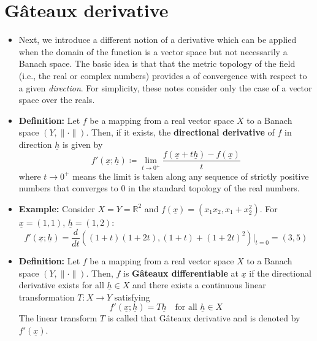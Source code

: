 \documentclass[11pt,twoside]{report}
\newcommand{\bbR}{{\mathbb{R}}}
\newcommand{\vecnot}{\underline}
\begin{document}
\section{G\^{a}teaux derivative}
\begin{itemize}


\item   Next, we introduce a different notion of a derivative which  can be applied when the domain of the function is a vector space but not necessarily a Banach space. The basic idea is that that the metric topology of the field  (i.e., the real or complex numbers) provides a of convergence with respect to a given \emph{direction}. For simplicity, these notes consider only the case of a vector space over the reals. 

\item \textbf{Definition:} Let $f $ be a mapping from a real vector space $X$ to a Banach space $(Y,\|\cdot\|)$.
Then, if it exists, the \textbf{directional derivative} of $f$ in direction $\vecnot{h}$  is given by 
\[
f'(\vecnot{x};\vecnot{h})  \coloneqq \lim_{t \to 0^+} \frac{f(\vecnot{x}+t \vecnot{h}) - f(\vecnot{x})}{t}
\]
where $t \to 0^+$ means the limit is taken along any sequence of strictly positive numbers that converges to $0$ in the standard topology of the real numbers. 

\item \textbf{Example:}  Consider $X =Y=\bbR^2$ and $f(\vecnot{x}) = (x_1 x_2,x_1+x_2^2)$.
For $\vecnot{x}=(1,1)$, $\vecnot{h}=(1,2)$: 
\[ 
f' ( \vecnot{x}; \vecnot{h} ) = \frac{d}{d t} ((1+t)(1+2t),(1+t)+(1+2t)^2) \Big|_{t=0} = (3,5)
\]



\item \textbf{Definition:} Let $f $ be a mapping from a real vector space $X$ to a Banach space $(Y,\|\cdot\|)$. Then, $f$ is \textbf{G\^{a}teaux differentiable} at $\vecnot{x}$ if the directional derivative exists for all $\vecnot{h} \in X$ and there exists a  continuous linear transformation $T\colon X \to Y$ satisfying
\[
f'(\vecnot{x};\vecnot{h})  = T \vecnot{h} \quad \text{for all $\vecnot{h} \in X$}
\]
 The linear transform $T$ is called that  G\^{a}teaux  derivative and is denoted by  $f'(\vecnot{x})$.



\end{itemize}
\end{document}
